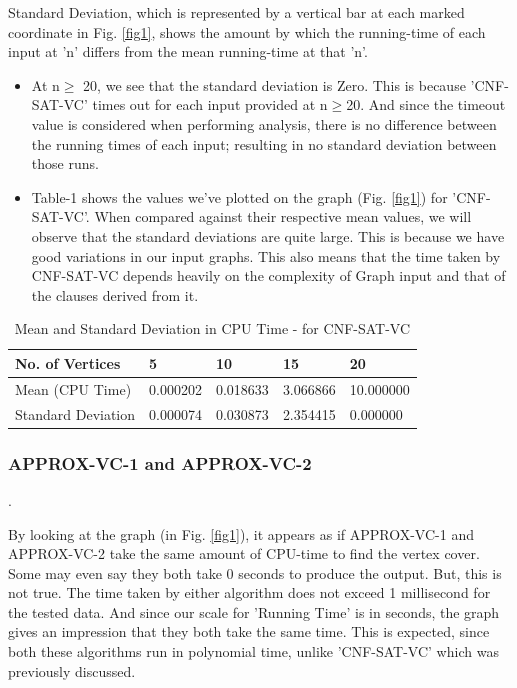 \documentclass[11pt]{llncs}
\begin{document}
		\vspace{-7mm}
		
		Standard Deviation, which is represented by a vertical bar at each marked coordinate in Fig. \ref{fig1},  shows the amount by which the running-time of each input at 'n' differs from the mean running-time at that 'n'.
		\vspace{-2mm}
		\begin{itemize}
  			\item At n$\geq$ 20, we see that the standard deviation is Zero. This is because 'CNF-SAT-VC' times out for each input provided at n$\geq$20. And since the timeout value is considered when performing analysis, there is no difference between the running times of each input; resulting in no standard deviation between those runs.
 			\item Table-1 shows the values we've plotted on the graph (Fig. \ref{fig1}) for 'CNF-SAT-VC'. When compared against their respective mean values, we will observe that the standard deviations are quite large. This is because we have good variations in our input graphs. This also means that the time taken by CNF-SAT-VC depends heavily on the complexity of Graph input and that of the clauses derived from it.
		\end{itemize}
		
		\vspace{-8mm}

		\begin{table}
			\caption{Mean and Standard Deviation in CPU Time - for CNF-SAT-VC}\label{tab1}
			\setlength{\tabcolsep}{12pt}
			\begin{tabular}{| l | l | l | l | l |}
				\hline
				No. of Vertices & 5 & 10 & 15 & 20 \\
				\hline
				Mean (CPU Time) & 0.000202  & 0.018633 & 3.066866 & 10.000000 \\
				Standard Deviation & 0.000074  & 0.030873 & 2.354415 & 0.000000 \\
				\hline
			\end{tabular}
		\end{table}
    	
	\vspace{-5mm}
    
	\subsubsection{APPROX-VC-1 and APPROX-VC-2}.

		By looking at the graph (in Fig. \ref{fig1}), it appears as if APPROX-VC-1 and APPROX-VC-2 take the same amount of CPU-time to find the vertex cover. Some may even say they both take 0 seconds to produce the output. But, this is not true. The time taken by either algorithm does not exceed 1 millisecond for the tested data. And since our scale for 'Running Time' is in seconds, the graph gives an impression that they both take the same time. This is expected, since both these algorithms run in polynomial time, unlike 'CNF-SAT-VC' which was previously discussed.\\
\end{document}
